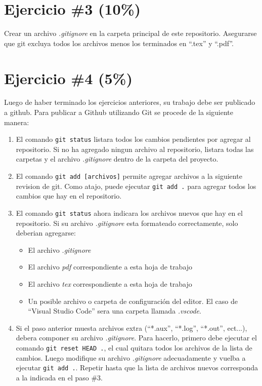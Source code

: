 \documentclass{article}
\begin{document}
\section*{Ejercicio \#3 (10\%)}
Crear un archivo \emph{.gitignore} en la carpeta principal de este repositorio.
Asegurarse que git excluya todos los archivos menos los terminados en ``.tex'' y ``.pdf''.

\section*{Ejercicio \#4 (5\%)}
Luego de haber terminado los ejercicios anteriores, su trabajo debe
ser publicado a github. Para publicar a Github utilizando Git se procede
de la siguiente manera:
\begin{enumerate}
        \item {
                El comando \texttt{git status} listara todos los
                cambios pendientes por agregar al repositorio. Si no
                ha agregado ningun archivo al repositorio, listara todas
                las carpetas y el archivo \emph{.gitignore} dentro de la
                carpeta del proyecto.
        }
        \item{
                El comando \texttt{git add [archivos]} permite agregar
                archivos a la siguiente revision de git. Como atajo,
                puede ejecutar \texttt{git add .} para agregar todos
                los cambios que hay en el repositorio.
        }
        \item {
                El comando \texttt{git status} ahora indicara los archivos
                nuevos que hay en el repositorio. Si su archivo \emph{.gitignore}
                esta formateado correctamente, solo deberian agregarse:
                \begin{itemize}
                        \item{El archivo \emph{.gitignore}}
                        \item{El archivo \emph{pdf} correspondiente a esta hoja de trabajo}
                        \item{El archivo \emph{tex} correspondiente a esta hoja de trabajo}
                        \item{Un posible archivo o carpeta de configuraci\'on del editor.
                        El caso de ``Visual Studio Code'' sera una carpeta llamada \emph{.vscode}.}
                \end{itemize}
        }
        \item{
                Si el paso anterior muesta archivos extra (``*.aux'', ``*.log'', ``*.out'', ect...),
                debera componer su archivo \emph{.gitignore}. Para hacerlo, primero
                debe ejecutar el comando \texttt{git reset HEAD .}, el cual quitara
                todos los archivos de la lista de cambios. Luego modifique su archivo \emph{.gitignore}
                adecuadamente y vuelba a ejecutar \texttt{git add .}. Repetir hasta
                que la lista de archivos nuevos corresponda a la indicada en el paso \#3.
        }
\end{enumerate}




\end{document}
